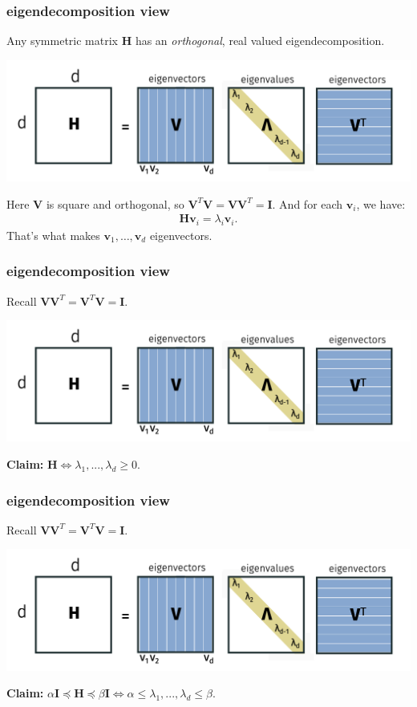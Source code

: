 \documentclass[compress]{beamer}
\newcommand{\bv}[1]{\mathbf{#1}}
\begin{document}
\begin{frame}[t]
	\frametitle{eigendecomposition view}
	Any symmetric matrix $\bv{H}$ has an \emph{orthogonal}, real valued eigendecomposition. 
	\begin{center}
		\includegraphics[width=.9\textwidth]{eigendecomp.png}
	\end{center}
Here $\bv{V}$ is square and orthogonal, so $\bv{V}^T\bv{V} = \bv{V}\bv{V}^T = \bv{I}$. And for each $\bv{v}_i$, we have:
\begin{align*}
	\bv{H}\bv{v}_i = \lambda_i \bv{v}_i. 
\end{align*}
That's what makes $\bv{v}_1, \ldots, \bv{v}_d$ eigenvectors.	
\end{frame}

\begin{frame}[t]
	\frametitle{eigendecomposition view}
	Recall $\bv{V}\bv{V}^T = \bv{V}^T\bv{V} = \bv{I}$.
	\begin{center}
		\includegraphics[width=.9\textwidth]{eigendecomp.png}
	\end{center}
	\textbf{Claim:}	$\bv{H} \Leftrightarrow \lambda_1, ..., \lambda_d \geq 0$. 
\end{frame}

\begin{frame}[t]
	\frametitle{eigendecomposition view}
	Recall $\bv{V}\bv{V}^T = \bv{V}^T\bv{V} = \bv{I}$.
	\begin{center}
		\includegraphics[width=.9\textwidth]{eigendecomp.png}
	\end{center}
	\textbf{Claim:}	$\alpha\bv{I} \preceq \bv{H} \preceq \beta \bv{I} \Leftrightarrow \alpha \leq \lambda_1, ..., \lambda_d \leq \beta$. 
\end{frame}
\end{document}
